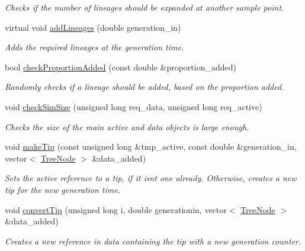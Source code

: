 \begin{DoxyCompactItemize}
\begin{DoxyCompactList}\small\item\em Checks if the number of lineages should be expanded at another sample point. \end{DoxyCompactList}\item 
virtual void \hyperlink{class_tree_a8bfa9a86f122b21900ec33ab4b1e323f}{add\+Lineages} (double generation\+\_\+in)
\begin{DoxyCompactList}\small\item\em Adds the required lineages at the generation time. \end{DoxyCompactList}\item 
bool \hyperlink{class_tree_aa3eef7c7e66a975d1dfd1a0a0148e037}{check\+Proportion\+Added} (const double \&proportion\+\_\+added)
\begin{DoxyCompactList}\small\item\em Randomly checks if a lineage should be added, based on the proportion added. \end{DoxyCompactList}\item 
void \hyperlink{class_tree_ab8a62d0ca2b1746676073e3f33e2a949}{check\+Sim\+Size} (unsigned long req\+\_\+data, unsigned long req\+\_\+active)
\begin{DoxyCompactList}\small\item\em Checks the size of the main active and data objects is large enough. \end{DoxyCompactList}\item 
void \hyperlink{class_tree_a3fa6fbeeb00d1661958f8e358796251c}{make\+Tip} (const unsigned long \&tmp\+\_\+active, const double \&generation\+\_\+in, vector$<$ \hyperlink{class_tree_node}{Tree\+Node} $>$ \&data\+\_\+added)
\begin{DoxyCompactList}\small\item\em Sets the active reference to a tip, if it isn\textquotesingle{}t one already. Otherwise, creates a new tip for the new generation time. \end{DoxyCompactList}\item 
void \hyperlink{class_tree_a370a23cfb08fd27ed1862bdfa605c5b8}{convert\+Tip} (unsigned long i, double generationin, vector$<$ \hyperlink{class_tree_node}{Tree\+Node} $>$ \&data\+\_\+added)
\begin{DoxyCompactList}\small\item\em Creates a new reference in data containing the tip with a new generation counter. \end{DoxyCompactList}\item 

\end{DoxyCompactItemize}
